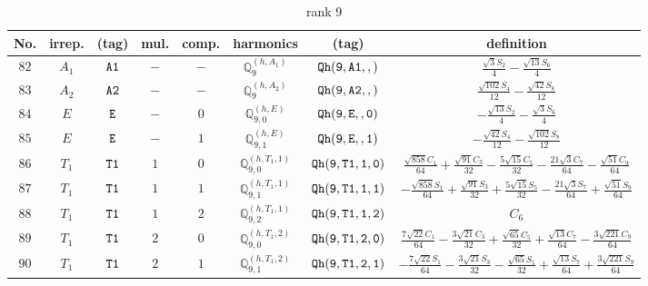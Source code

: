 \documentclass[fleqn,8pt]{jsarticle}
\begin{document}
\begin{table}[ht!]
\begin{center}
\caption{rank 9}
\renewcommand{\arraystretch}{1.3}
\begin{tabular}{cccccccc} \hline \hline
No. & irrep. & (tag) & mul. & comp. & harmonics & (tag) & definition \\ \hline
$ 82 $ & $ A_{1} $ & $ {\tt A1} $ & $ - $ & $ - $ & $ \mathbb{Q}_{9}^{(h,A_{1})} $ & $ {\tt Qh(9,A1,,)} $ & $ \frac{\sqrt{3} S_{2}}{4} - \frac{\sqrt{13} S_{6}}{4} $ \\
$ 83 $ & $ A_{2} $ & $ {\tt A2} $ & $ - $ & $ - $ & $ \mathbb{Q}_{9}^{(h,A_{2})} $ & $ {\tt Qh(9,A2,,)} $ & $ \frac{\sqrt{102} S_{4}}{12} - \frac{\sqrt{42} S_{8}}{12} $ \\
$ 84 $ & $ E $ & $ {\tt E} $ & $ - $ & $ 0 $ & $ \mathbb{Q}_{9,0}^{(h,E)} $ & $ {\tt Qh(9,E,,0)} $ & $ - \frac{\sqrt{13} S_{2}}{4} - \frac{\sqrt{3} S_{6}}{4} $ \\
$ 85 $ & $ E $ & $ {\tt E} $ & $ - $ & $ 1 $ & $ \mathbb{Q}_{9,1}^{(h,E)} $ & $ {\tt Qh(9,E,,1)} $ & $ - \frac{\sqrt{42} S_{4}}{12} - \frac{\sqrt{102} S_{8}}{12} $ \\
$ 86 $ & $ T_{1} $ & $ {\tt T1} $ & $ 1 $ & $ 0 $ & $ \mathbb{Q}_{9,0}^{(h,T_{1},1)} $ & $ {\tt Qh(9,T1,1,0)} $ & $ \frac{\sqrt{858} C_{1}}{64} + \frac{\sqrt{91} C_{3}}{32} - \frac{5 \sqrt{15} C_{5}}{32} - \frac{21 \sqrt{3} C_{7}}{64} - \frac{\sqrt{51} C_{9}}{64} $ \\
$ 87 $ & $ T_{1} $ & $ {\tt T1} $ & $ 1 $ & $ 1 $ & $ \mathbb{Q}_{9,1}^{(h,T_{1},1)} $ & $ {\tt Qh(9,T1,1,1)} $ & $ - \frac{\sqrt{858} S_{1}}{64} + \frac{\sqrt{91} S_{3}}{32} + \frac{5 \sqrt{15} S_{5}}{32} - \frac{21 \sqrt{3} S_{7}}{64} + \frac{\sqrt{51} S_{9}}{64} $ \\
$ 88 $ & $ T_{1} $ & $ {\tt T1} $ & $ 1 $ & $ 2 $ & $ \mathbb{Q}_{9,2}^{(h,T_{1},1)} $ & $ {\tt Qh(9,T1,1,2)} $ & $ C_{6} $ \\
$ 89 $ & $ T_{1} $ & $ {\tt T1} $ & $ 2 $ & $ 0 $ & $ \mathbb{Q}_{9,0}^{(h,T_{1},2)} $ & $ {\tt Qh(9,T1,2,0)} $ & $ \frac{7 \sqrt{22} C_{1}}{64} - \frac{3 \sqrt{21} C_{3}}{32} + \frac{\sqrt{65} C_{5}}{32} + \frac{\sqrt{13} C_{7}}{64} - \frac{3 \sqrt{221} C_{9}}{64} $ \\
$ 90 $ & $ T_{1} $ & $ {\tt T1} $ & $ 2 $ & $ 1 $ & $ \mathbb{Q}_{9,1}^{(h,T_{1},2)} $ & $ {\tt Qh(9,T1,2,1)} $ & $ - \frac{7 \sqrt{22} S_{1}}{64} - \frac{3 \sqrt{21} S_{3}}{32} - \frac{\sqrt{65} S_{5}}{32} + \frac{\sqrt{13} S_{7}}{64} + \frac{3 \sqrt{221} S_{9}}{64} $ \\

\end{tabular}
\end{center}
\end{table}
\end{document}
